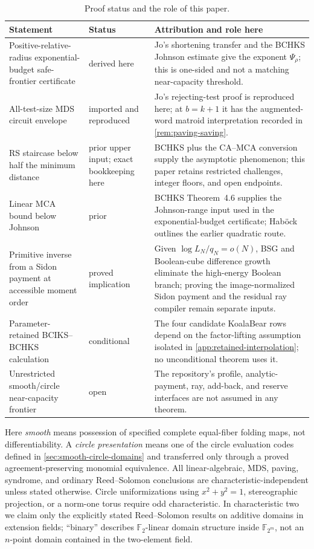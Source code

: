 \documentclass[11pt,a4paper]{amsart}
\numberwithin{equation}{section}
\theoremstyle{remark}
\newcommand{\F}{\mathbb F}
\begin{document}
\begin{table}[tbp]
\centering
\caption{Proof status and the role of this paper.}
\label{tab:novelty-status}
\small
\begin{tabularx}{\textwidth}{@{}P{0.28\textwidth}P{0.20\textwidth}Y@{}}
\toprule
Statement & Status & Attribution and role here \\
\midrule
Positive-relative-radius exponential-budget safe-frontier certificate &
derived here & Jo's shortening transfer and the BCHKS Johnson estimate give
the exponent \(\Psi_\rho\); this is one-sided and not a matching
near-capacity threshold. \\
All-test-size MDS circuit envelope & imported and reproduced &
Jo's rejecting-test proof is reproduced here; at \(b=k+1\) it has the
augmented-word matroid interpretation recorded in
\cref{rem:paving-saving}. \\
RS staircase below half the minimum distance & prior upper input; exact
bookkeeping here & BCHKS plus the CA--MCA conversion supply the asymptotic
phenomenon; this paper retains restricted challenges, integer floors, and
open endpoints. \\
Linear MCA bound below Johnson & prior & BCHKS Theorem~4.6 supplies the
Johnson-range input used in the exponential-budget certificate; Hab\"ock
outlines the earlier quadratic route. \\
Primitive inverse from a Sidon payment at accessible moment order &
proved implication & Given \(\log L_N/q_N=o(N)\), BSG and Boolean-cube
difference growth eliminate the high-energy Boolean branch; proving the
image-normalized Sidon payment and the residual ray compiler remain separate
inputs. \\
Parameter-retained BCIKS--BCHKS calculation & conditional & The four
candidate KoalaBear rows depend on the factor-lifting assumption isolated in
\cref{app:retained-interpolation}; no unconditional theorem uses it. \\
Unrestricted smooth/circle near-capacity frontier & open & The repository's
profile, analytic-payment, ray, add-back, and reserve interfaces are not
assumed in any theorem. \\
\bottomrule
\end{tabularx}
\end{table}

Here \emph{smooth} means possession of specified complete equal-fiber
folding maps, not differentiability.  A \emph{circle presentation} means one
of the circle evaluation codes defined in \cref{sec:smooth-circle-domains}
and transferred only through a proved agreement-preserving monomial
equivalence.  All linear-algebraic, MDS, paving, syndrome, and ordinary
Reed--Solomon conclusions are characteristic-independent unless stated
otherwise.  Circle uniformizations using \(x^2+y^2=1\), stereographic
projection, or a norm-one torus require odd characteristic.  In
characteristic two we claim only the explicitly stated Reed--Solomon results
on additive domains in extension fields; ``binary'' describes
\(\F_2\)-linear domain structure inside \(\F_{2^m}\), not an \(n\)-point
domain contained in the two-element field.
\end{document}
